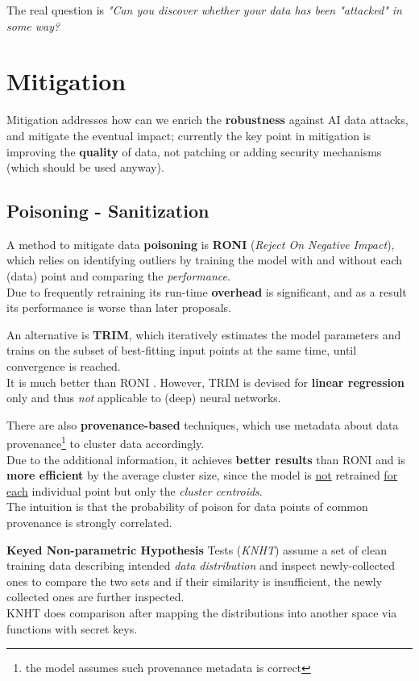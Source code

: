 \begin{center}
   The real question is \emph{"Can you discover whether your data has been \emph{"attacked"} in some way?}
\end{center}
   
\section{Mitigation}
Mitigation addresses how can we enrich the \textbf{robustness} against AI data attacks, and mitigate the eventual impact;
currently the key point in mitigation is improving the \textbf{quality} of data, not patching or adding security mechanisms (which should be used anyway).
\subsection{Poisoning - Sanitization}
A method to mitigate data \textbf{poisoning} is \textbf{RONI} (\textit{Reject On Negative Impact}), which relies on identifying outliers by training the model with and without each (data) point and comparing the \textit{performance}.\\
Due to frequently retraining its run-time \textbf{overhead} is significant,
and as a result its performance is worse than later proposals.

An alternative is \textbf{TRIM},
which iteratively estimates the model parameters and trains on the
subset of best-fitting input points at the same time, until convergence is reached.\\
It is much better than RONI \smiley.
However, TRIM is devised for \textbf{linear regression} only and thus \textit{not} applicable to (deep) neural networks.

There are also \textbf{provenance-based} techniques, which use metadata about data provenance\footnote{the model assumes such provenance metadata is correct}
to cluster data accordingly.\\
Due to the additional information, it achieves \textbf{better results} than RONI and
is \textbf{more efficient} by the average cluster size, since the model is \underline{not}
retrained \underline{for each} individual point but only the \textit{cluster centroids}.\\
The intuition is that the probability of poison for data points of common
provenance is strongly correlated.

\textbf{Keyed Non-parametric Hypothesis} Tests (\textit{KNHT}) assume a set of clean training data describing intended \textit{data distribution} and
inspect newly-collected ones to compare the two sets and if their similarity
is insufficient, the newly collected ones are further inspected.\\
KNHT does comparison after mapping the distributions into another space
via functions with secret keys.


